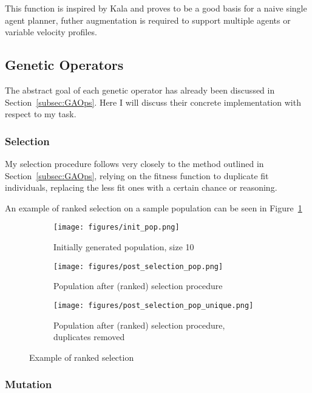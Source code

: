 This function is inspired by Kala\cite{kalaOptimizationBasedPlanning2016} and proves to be a good basis for a naive single agent planner, futher augmentation is required to support multiple agents or variable velocity profiles.


\subsection{Genetic Operators}

The abstract goal of each genetic operator has already been discussed in Section~\ref{subsec:GAOps}. Here I will discuss their concrete implementation with respect to my task.

\subsubsection{Selection}

My selection procedure follows very closely to the method outlined in Section~\ref{subsec:GAOps}, relying on the fitness function to duplicate fit individuals, replacing the less fit ones with a certain chance or reasoning.

An example of ranked selection on a sample population can be seen in Figure~\ref{fig:selection_eg}

\begin{figure}
  \centering
  \begin{subfigure}[b]{0.44\textwidth}
    \centering
    \texttt{[image: figures/init\_pop.png]}
    \caption{Initially generated population, size 10}
  \end{subfigure}
  \begin{subfigure}[b]{0.44\textwidth}
    \centering
    \texttt{[image: figures/post\_selection\_pop.png]}
    \caption{Population after (ranked) selection procedure}
  \end{subfigure}
  \begin{subfigure}[b]{0.44\textwidth}
    \centering
    \texttt{[image: figures/post\_selection\_pop\_unique.png]}
    \caption{Population after (ranked) selection procedure, duplicates removed}
  \end{subfigure}
  \caption{\label{fig:selection_eg} Example of ranked selection}
\end{figure}


\subsubsection{Mutation}

